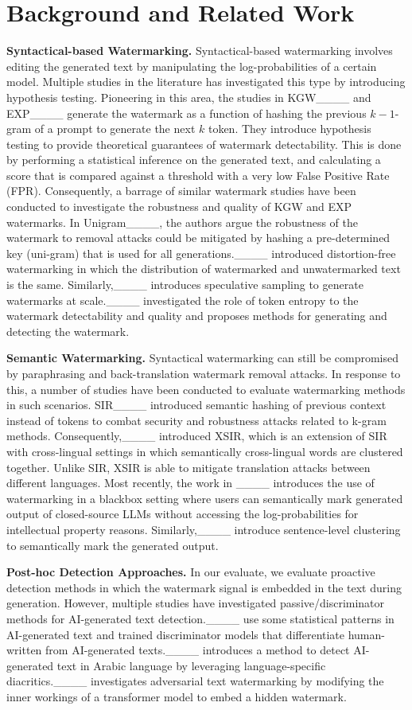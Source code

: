 \section{Background and Related Work}
\textbf{Syntactical-based Watermarking.} Syntactical-based watermarking involves editing the generated text by manipulating the log-probabilities of a certain model. Multiple studies in the literature has investigated this type by introducing hypothesis testing. Pioneering in this area, the studies in KGW____ and EXP____ generate the watermark as a function of hashing the previous $k-1$-gram of a prompt to generate the next $k$ token. They introduce hypothesis testing to provide theoretical guarantees of watermark detectability. This is done by performing a statistical inference on the generated text, and calculating a score that is compared against a threshold with a very low False Positive Rate (FPR). Consequently, a barrage of similar watermark studies have been conducted to investigate the robustness and quality of KGW and EXP watermarks. In Unigram____, the authors argue the robustness of the watermark to removal attacks could be mitigated by hashing a pre-determined key (uni-gram) that is used for all generations.____ introduced distortion-free watermarking in which the distribution of watermarked and unwatermarked text is the same. Similarly,____ introduces speculative sampling to generate watermarks at scale.____ investigated the role of token entropy to the watermark detectability and quality and proposes methods for generating and detecting the watermark. 

\noindent\textbf{Semantic Watermarking.} Syntactical watermarking can still be compromised by paraphrasing and back-translation watermark removal attacks. In response to this, a number of studies have been conducted to evaluate watermarking methods in such scenarios. SIR____ introduced semantic hashing of previous context instead of tokens to combat security and robustness attacks related to k-gram methods. Consequently,____ introduced XSIR, which is an extension of SIR with cross-lingual settings in which semantically cross-lingual words are clustered together. Unlike SIR, XSIR is able to mitigate translation attacks between different languages. Most recently, the work in ____ introduces the use of watermarking in a blackbox setting where users can semantically mark generated output of closed-source LLMs without accessing the log-probabilities for intellectual property reasons. Similarly,____ introduce sentence-level clustering to semantically mark the generated output.

\noindent\textbf{Post-hoc Detection Approaches.}
In our evaluate, we evaluate proactive detection methods in which the watermark signal is embedded in the text during generation. However, 
multiple studies have investigated passive/discriminator methods for AI-generated text detection.____ use some statistical patterns in AI-generated text and trained discriminator models that differentiate human-written from AI-generated texts.____ introduces a method to detect AI-generated text in Arabic language by leveraging language-specific diacritics.____ investigates adversarial text watermarking by modifying the inner workings of a transformer model to embed a hidden watermark.